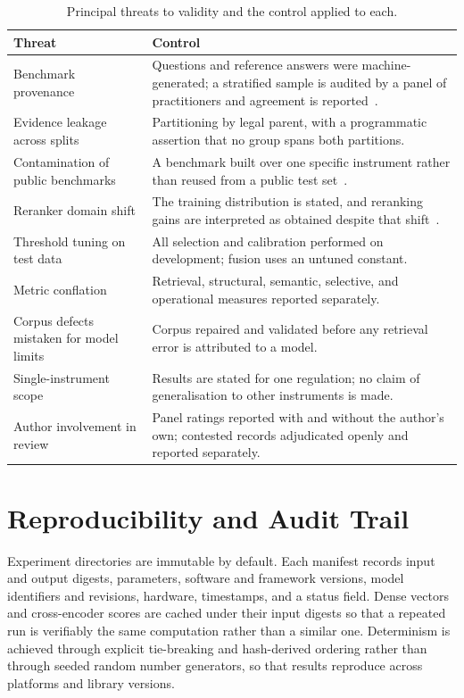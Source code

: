 \begin{table}[htbp]
  \centering
  \caption{Principal threats to validity and the control applied to each.}
  \label{tab:threats}
  \small
  \begin{tabularx}{\textwidth}{@{}l X@{}}
    \toprule
    \textbf{Threat} & \textbf{Control} \\
    \midrule
    Benchmark provenance & Questions and reference answers were machine-generated; a stratified sample is audited by a panel of practitioners and agreement is reported~\cite{saadfalcon2024ares}. \\
    Evidence leakage across splits & Partitioning by legal parent, with a programmatic assertion that no group spans both partitions. \\
    Contamination of public benchmarks & A benchmark built over one specific instrument rather than reused from a public test set~\cite{sainz2023contamination}. \\
    Reranker domain shift & The training distribution is stated, and reranking gains are interpreted as obtained despite that shift~\cite{nguyen2016msmarco}. \\
    Threshold tuning on test data & All selection and calibration performed on development; fusion uses an untuned constant. \\
    Metric conflation & Retrieval, structural, semantic, selective, and operational measures reported separately. \\
    Corpus defects mistaken for model limits & Corpus repaired and validated before any retrieval error is attributed to a model. \\
    Single-instrument scope & Results are stated for one regulation; no claim of generalisation to other instruments is made. \\
    Author involvement in review & Panel ratings reported with and without the author's own; contested records adjudicated openly and reported separately. \\
    \bottomrule
  \end{tabularx}
\end{table}

\section{Reproducibility and Audit Trail}
\label{sec:method-repro}

Experiment directories are immutable by default. Each manifest records input and output digests, parameters, software and framework versions, model identifiers and revisions, hardware, timestamps, and a status field. Dense vectors and cross-encoder scores are cached under their input digests so that a repeated run is verifiably the same computation rather than a similar one. Determinism is achieved through explicit tie-breaking and hash-derived ordering rather than through seeded random number generators, so that results reproduce across platforms and library versions.

